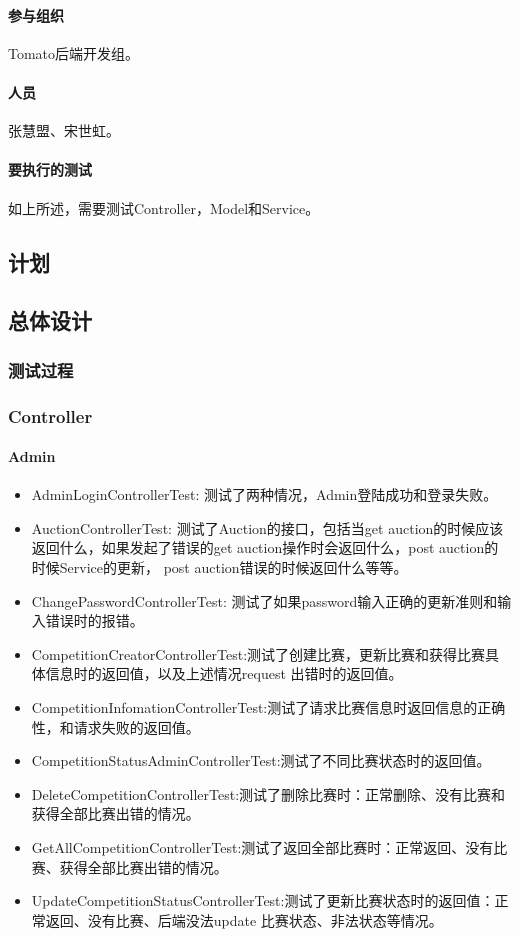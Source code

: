 \documentclass{article}
\begin{document}
\paragraph{参与组织}
	Tomato后端开发组。
\paragraph{人员}
	张慧盟、宋世虹。
\paragraph{要执行的测试}
	如上所述，需要测试Controller，Model和Service。
\subsection{计划}
\subsection{总体设计}
\subsubsection{测试过程}
	\subsubsection{Controller}
		\paragraph{Admin}
			\begin{itemize}
			\item AdminLoginControllerTest: 测试了两种情况，Admin登陆成功和登录失败。
			\item AuctionControllerTest: 测试了Auction的接口，包括当get auction的时候应该返回什么，如果发起了错误的get auction操作时会返回什么，post auction的时候Service的更新， post auction错误的时候返回什么等等。
			\item ChangePasswordControllerTest: 测试了如果password输入正确的更新准则和输入错误时的报错。
			\item CompetitionCreatorControllerTest:测试了创建比赛，更新比赛和获得比赛具体信息时的返回值，以及上述情况request 出错时的返回值。
			\item CompetitionInfomationControllerTest:测试了请求比赛信息时返回信息的正确性，和请求失败的返回值。
			\item CompetitionStatusAdminControllerTest:测试了不同比赛状态时的返回值。
			\item DeleteCompetitionControllerTest:测试了删除比赛时：正常删除、没有比赛和获得全部比赛出错的情况。
			\item GetAllCompetitionControllerTest:测试了返回全部比赛时：正常返回、没有比赛、获得全部比赛出错的情况。
			\item UpdateCompetitionStatusControllerTest:测试了更新比赛状态时的返回值：正常返回、没有比赛、后端没法update 比赛状态、非法状态等情况。
			\end{itemize}
\end{document}
